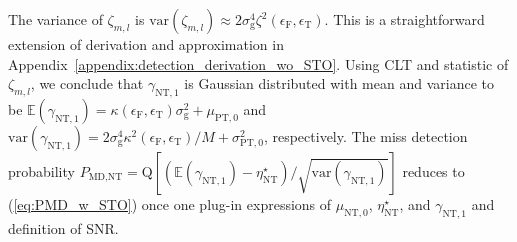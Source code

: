 \documentclass[journal]{IEEEtran}
\newcommand{\CFO}[0]{\epsilon_{\text{F}}}
\newcommand{\STO}[0]{\epsilon_{\text{T}}}
\newcommand{\Nb}[0]{N_{\text{B}}}
\newcommand{\Nc}[0]{N_{\text{c}}}
\newcommand{\sigman}[0]{\sigma_{\text{n}}}
\newcommand{\var}[0]{\mathrm{var}}
\newcommand{\Q}[0]{\mathrm{Q}}
\begin{document}
The variance of $\zeta_{m,l}$ is $\var\left(\zeta_{m,l}\right) \approx  2\sigma^4_{\text{g}}\zeta^2(\CFO,\STO)$. This is a straightforward extension of derivation and approximation in Appendix~\ref{appendix:detection_derivation_wo_STO}. Using CLT and statistic of $\zeta_{m,l}$, we conclude that $\gamma_{\text{NT},1}$ is Gaussian distributed with mean and variance to be
$\mathbb{E}(\gamma_{\text{NT},1}) = \kappa(\CFO,\STO) \sigma^2_{\text{g}} + \mu_{\text{PT},0}$ and $\text{var}(\gamma_{\text{NT},1}) = 2\sigma^4_{\text{g}}\kappa^2(\CFO,\STO)/M + \sigma^2_{\text{PT},0}$, respectively. The miss detection probability $P_{\text{MD,NT}} = \Q[(\mathbb{E}(\gamma_{\text{NT},1}) - \eta^{\star}_{\text{NT}})/\sqrt{\var(\gamma_{\text{NT},1})}]$ reduces to (\ref{eq:PMD_w_STO}) once one plug-in expressions of $\mu_{\text{NT},0}$, $\eta^{\star}_{\text{NT}}$, and $\gamma_{\text{NT},1}$ and definition of SNR.

\end{document}
